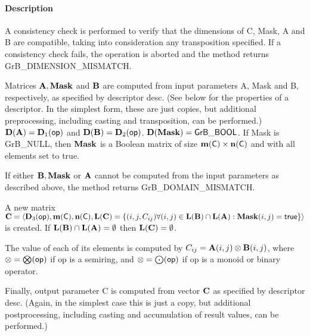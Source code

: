 \paragraph{Description}

A consistency check is performed to verify that the 
dimensions of {\sf C}, {\sf Mask}, {\sf A} and {\sf B}
are compatible, taking into consideration any transposition specified.
If a consistency check fails, the operation is aborted and the method 
returns {\sf GrB\_DIMENSION\_MISMATCH}.


Matrices ${\bf A}, {\bf Mask}$ and ${\bf B}$ are computed from
input parameters {\sf A}, {\sf Mask} and {\sf B}, respectively, as specified
by descriptor {\sf desc}. (See below for the properties of a descriptor. In
the simplest form, these are just copies, but additional preprocessing,
including casting and transposition, can be performed.)  $\bold{D}({\bf A}) =
\bold{D}_1({\sf op})$ and $\bold{D}({\bf B}) = \bold{D}_2({\sf op})$.
$\bold{D}({\bf Mask}) = {\sf GrB\_BOOL}$.  If {\sf Mask} is {\sf GrB\_NULL},
then ${\bf Mask}$ is a Boolean matrix of size $\bold{m}({\bf \sf C}) \times \bold{n}({\bf \sf C})$
and with all elements set to {\sf true}.

If either ${\bf B}, {\bf Mask}$ or ${\bf A}$ cannot be computed
from the input parameters as described above, the method returns {\sf
GrB\_DOMAIN\_MISMATCH}.  

A new matrix ${\bf C} = \langle \bold{D}_3({\sf op}), \bold{m}({\bf \sf C}),
\bold{n}({\bf \sf C}), \bold{L}({\bf C}) = \{(i,j,C_{ij})  \forall (i,j) \in
\bold{L}({\bf B}) \cap \bold{L}({\bf A}) : {\bf Mask}(i,j)
= {\sf true} \} \rangle$ is created.  
If $\bold{L}({\bf B}) \cap \bold{L}({\bf A}) = \emptyset$
then $\bold{L}({\bf C}) = \emptyset$.

The value of each of its elements is computed by 
$C_{ij} = {\bf A}(i,j) \otimes {\bf B}(i,j)$, where
$\otimes = \bigotimes({\sf op})$ if {\sf op} is a semiring, and 
$\otimes = \bigodot({\sf op})$ if {\sf op} is a monoid or binary operator.

Finally, output parameter {\sf C} is computed from vector ${\bf C}$
as specified by descriptor {\sf desc}. (Again, in the simplest case this
is just a copy, but additional postprocessing, including casting and
accumulation of result values, can be performed.) 

